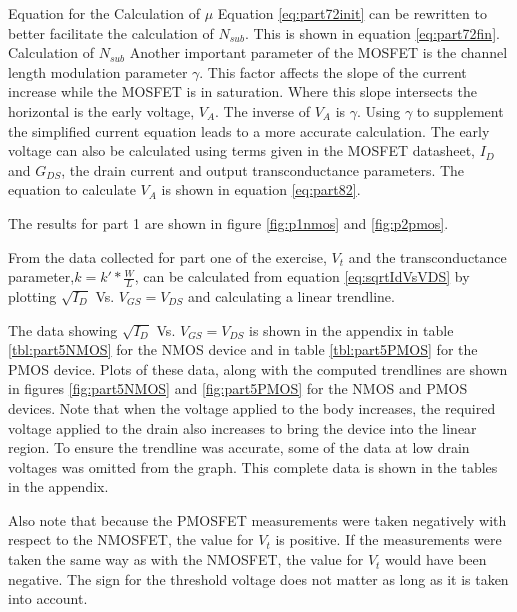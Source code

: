 	{Equation for the Calculation of $\mu$}
Equation \ref{eq:part72init} can be rewritten to better facilitate the calculation of $N_{sub}$. This is shown in equation \ref{eq:part72fin}. 
	{Calculation of $N_{sub}$}
Another important parameter of the MOSFET is the channel length modulation parameter $\gamma$. This factor affects the slope of the current increase while the MOSFET is in saturation. Where this slope intersects the horizontal is the early voltage, $V_A$. The inverse of $V_A$ is $\gamma$. Using $\gamma$ to supplement the simplified current equation leads to a more accurate calculation. 
The early voltage can also be calculated using terms given in the MOSFET datasheet, $I_D$ and $G_{DS}$, the drain current and output transconductance parameters. The equation to calculate $V_A$ is shown in equation \ref{eq:part82}.

The results for part 1 are shown in figure \ref{fig:p1nmos} and \ref{fig:p2pmos}.


From the data collected for part one of the exercise, $V_t$ and the transconductance parameter,$k=k'* \frac{W}{L}$, can be calculated from equation \ref{eq:sqrtIdVsVDS} by plotting $\sqrt{I_D}$ Vs. $V_{GS}=V_{DS}$ and calculating a linear trendline.

The data showing $\sqrt{I_D}$ Vs. $V_{GS}=V_{DS}$ is shown in the appendix in table \ref{tbl:part5NMOS} for the NMOS device and in table \ref{tbl:part5PMOS} for the PMOS device. 
Plots of these data, along with the computed trendlines are shown in figures \ref{fig:part5NMOS} and \ref{fig:part5PMOS} for the NMOS and PMOS devices. 
Note that when the voltage applied to the body increases, the required voltage applied to the drain also increases to bring the device into the linear region. To ensure the trendline was accurate, some of the data at low drain voltages was omitted from the graph. This complete data is shown in the tables in the appendix. 

Also note that because the PMOSFET measurements were taken negatively with respect to the NMOSFET, the value for $V_t$ is positive. If the measurements were taken the same way as with the NMOSFET, the value for $V_t$ would have been negative. The sign for the threshold voltage does not matter as long as it is taken into account. 

